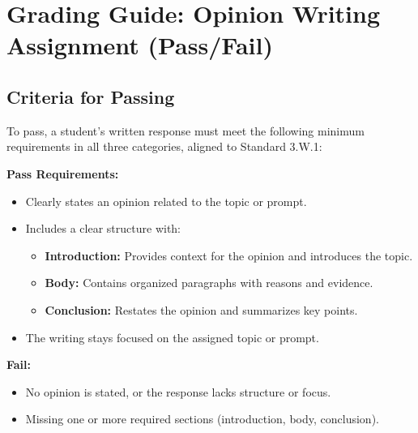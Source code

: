 \documentclass[12pt]{article}
\begin{document}
\section*{Grading Guide: Opinion Writing Assignment (Pass/Fail)}

\subsection*{Criteria for Passing}

To pass, a student’s written response must meet the following minimum requirements in all three categories, aligned to Standard 3.W.1:

\begin{tcolorbox}[colframe=black!60, colback=white, title=Purpose, Focus, and Organization]
\textbf{Pass Requirements:}
\begin{itemize}
    \item Clearly states an opinion related to the topic or prompt.
    \item Includes a clear structure with:
    \begin{itemize}
        \item \textbf{Introduction:} Provides context for the opinion and introduces the topic.
        \item \textbf{Body:} Contains organized paragraphs with reasons and evidence.
        \item \textbf{Conclusion:} Restates the opinion and summarizes key points.
    \end{itemize}
    \item The writing stays focused on the assigned topic or prompt.
\end{itemize}

\textbf{Fail:}
\begin{itemize}
    \item No opinion is stated, or the response lacks structure or focus.
    \item Missing one or more required sections (introduction, body, conclusion).
\end{itemize}
\end{tcolorbox}
\end{document}
